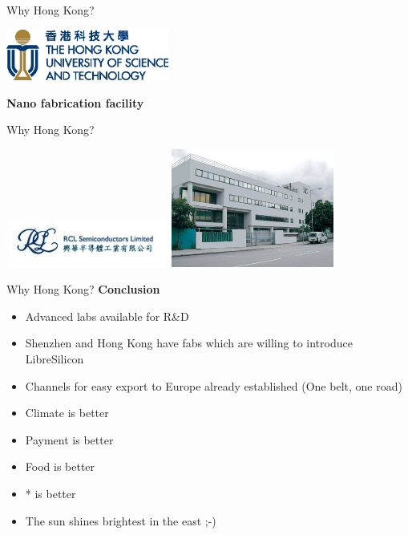 \documentclass[aspectratio=169]{beamer}
\begin{document}
\begin{frame}{Why Hong Kong?}
	\begin{center}
		\includegraphics[width=0.4\textwidth]{images/u=3232688716,3661225619&fm=26&gp=0.jpg}
		
		\textbf{Nano fabrication facility}
	\end{center}
\end{frame}

\begin{frame}{Why Hong Kong?}
	\begin{center}
		\includegraphics[width=0.4\textwidth]{images/RCL.jpg}
		\includegraphics[width=0.4\textwidth]{images/factory.jpg}
	\end{center}
\end{frame}

\begin{frame}{Why Hong Kong?}
	\textbf{Conclusion}
	\begin{itemize}
		\item Advanced labs available for R\&D
		\item Shenzhen and Hong Kong have fabs which are willing to introduce LibreSilicon
		\item Channels for easy export to Europe already established (One belt, one road)
		\item Climate is better
		\item Payment is better
		\item Food is better
		\item * is better
		\item The sun shines brightest in the east ;-)
	\end{itemize}
\end{frame}
\end{document}
